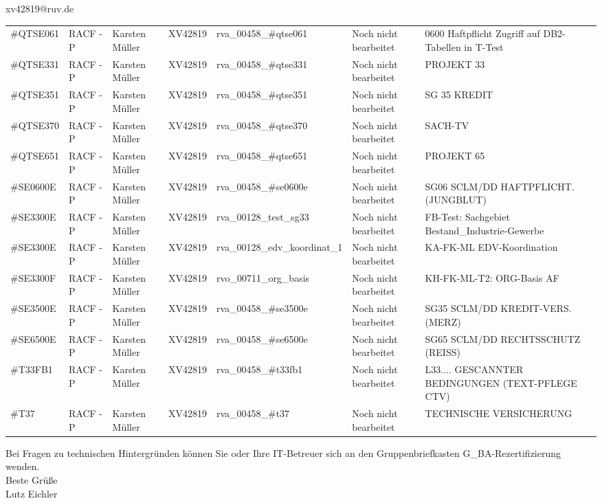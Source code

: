 \documentclass[a4paper,landscape,12pt]{letter}
\begin{document}
\begin{letter}{xv42819@ruv.de\hfill \break}
\begin{tiny}
\begin{longtable}{|p{35mm}|p{15mm}|p{25mm}|p{10mm}|p{40mm}|p{50mm}|p{50mm}|}
\#QTSE061 & RACF - P & Karsten Müller & XV42819 & rva\_00458\_\#qtse061 & Noch nicht bearbeitet & 0600 Haftpflicht Zugriff auf DB2-Tabellen in T-Test \\
\#QTSE331 & RACF - P & Karsten Müller & XV42819 & rva\_00458\_\#qtse331 & Noch nicht bearbeitet & PROJEKT 33 \\
\#QTSE351 & RACF - P & Karsten Müller & XV42819 & rva\_00458\_\#qtse351 & Noch nicht bearbeitet & SG 35 KREDIT \\
\#QTSE370 & RACF - P & Karsten Müller & XV42819 & rva\_00458\_\#qtse370 & Noch nicht bearbeitet & SACH-TV \\
\#QTSE651 & RACF - P & Karsten Müller & XV42819 & rva\_00458\_\#qtse651 & Noch nicht bearbeitet & PROJEKT 65 \\
\#SE0600E & RACF - P & Karsten Müller & XV42819 & rva\_00458\_\#se0600e & Noch nicht bearbeitet & SG06 SCLM/DD HAFTPFLICHT.(JUNGBLUT) \\
\#SE3300E & RACF - P & Karsten Müller & XV42819 & rva\_00128\_test\_sg33 & Noch nicht bearbeitet & FB-Test: Sachgebiet Bestand\_Industrie-Gewerbe \\
\#SE3300E & RACF - P & Karsten Müller & XV42819 & rva\_00128\_edv\_koordinat\_1 & Noch nicht bearbeitet & KA-FK-ML EDV-Koordination \\
\#SE3300F & RACF - P & Karsten Müller & XV42819 & rvo\_00711\_org\_basis & Noch nicht bearbeitet & KH-FK-ML-T2: ORG-Basis AF \\
\#SE3500E & RACF - P & Karsten Müller & XV42819 & rva\_00458\_\#se3500e & Noch nicht bearbeitet & SG35 SCLM/DD  KREDIT-VERS. (MERZ) \\
\#SE6500E & RACF - P & Karsten Müller & XV42819 & rva\_00458\_\#se6500e & Noch nicht bearbeitet & SG65 SCLM/DD RECHTSSCHUTZ (REISS) \\
\#T33FB1 & RACF - P & Karsten Müller & XV42819 & rva\_00458\_\#t33fb1 & Noch nicht bearbeitet & L33.... GESCANNTER BEDINGUNGEN (TEXT-PFLEGE CTV) \\
\#T37 & RACF - P & Karsten Müller & XV42819 & rva\_00458\_\#t37 & Noch nicht bearbeitet & TECHNISCHE VERSICHERUNG \\

\hline
		\end{longtable}
		\end{tiny}
	
\begin{minipage}{\textwidth}
			Bei Fragen zu technischen Hintergründen können Sie 
			oder Ihre IT-Betreuer sich an den Gruppenbriefkasten 
			G\_BA-Rezertifizierung
			wenden.\\
			\linebreak
			Beste Grüße\\
			Lutz Eichler
	\end{minipage}
	\end{letter}
	
\end{document}
